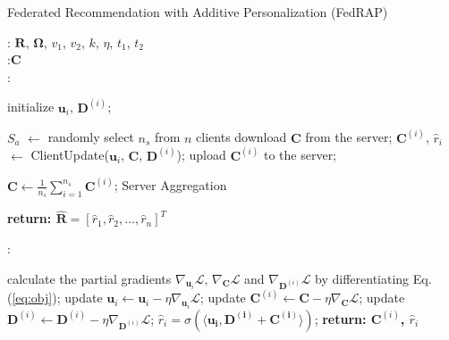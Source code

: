 \documentclass{article} %
\newcommand{\customeqref}[1]{({\ref{#1}})}
\begin{document}
\begin{algorithm}[!htbp]
    \begin{minipage}{1\linewidth}
    \caption{Federated Recommendation with Additive Personalization (FedRAP)}
    \label{alg:algorithm}
    
    \hspace*{0.05in}{\bf Input}: $\mathbf{R}$, $\mathbf{\Omega}$, $v_1$, $v_2$, $k$, $\eta$, $t_1$, $t_2$ \\
    \hspace*{0.05in}{\bf Initialize}:$\mathbf{C}$ \\
    \hspace*{0.05in}{\bf Global Procedure}:
    \begin{algorithmic}[1]

            \State initialize $\mathbf{u}_i$, $\mathbf{D}^{(i)}$;
        \EndFor

            \State $S_a$ $\leftarrow$ randomly select $n_s$ from $n$ clients
                \State download $\mathbf{C}$ from the server;
                \State $\mathbf{C}^{(i)}$, $\hat{r}_i$ $\leftarrow$ ClientUpdate($\mathbf{u}_i$, $\mathbf{C}$, $\mathbf{D}^{(i)}$);
                \State upload $\mathbf{C}^{(i)}$ to the server;
            \EndFor
            
            \State $\mathbf{C} \leftarrow \frac{1}{n_s} \sum^{n_s}_{i=1} \mathbf{C}^{(i)}$; 
            \Comment Server Aggregation

        \EndFor

        \State \bf return: $\hat{\mathbf{R}} = [\hat{r}_1, \hat{r}_2, \dots, \hat{r}_n]^T$
    \end{algorithmic}

    \hspace*{0.05in}{\bf ClientUpdate}:
    \begin{algorithmic}[1]
            \State calculate the partial gradients $\nabla_{\mathbf{u}_i} \mathcal{L}$, $\nabla_{\mathbf{C}} \mathcal{L}$ and $\nabla_{\mathbf{D}^{(i)}} \mathcal{L}$ by differentiating Eq. \customeqref{eq:obj};
            \State update $\mathbf{u}_i \leftarrow \mathbf{u}_i - \eta \nabla_{\mathbf{u}_i} \mathcal{L}$;
            \State update $\mathbf{C}^{(i)} \leftarrow \mathbf{C} - \eta \nabla_{\mathbf{C}} \mathcal{L}$;
            \State update $\mathbf{D}^{(i)} \leftarrow \mathbf{D}^{(i)} - \eta \nabla_{\mathbf{D}^{(i)}} \mathcal{L}$;
        \EndFor
        \State $\hat{r}_i = \sigma(\langle\mathbf{\mathbf{u}_i, \mathbf{D}^{(i)} + \mathbf{C}^{(i)}}\rangle)$;
        \State \bf return: $\mathbf{C}^{(i)}$, $\hat{r}_i$
    \end{algorithmic}
    \end{minipage}
\end{algorithm}
\end{document}
